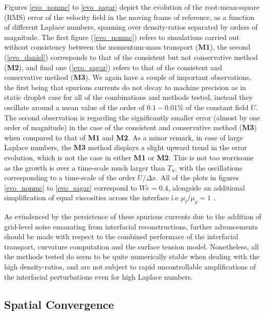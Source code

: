 Figures \ref{evo_nonmc} to \ref{evo_sagar} depict the evolution of the root-mean-square (RMS) error of the velocity field in the moving frame of reference, as a function of different Laplace numbers, spanning over density-ratios separated by orders of magnitude. The first figure (\ref{evo_nonmc}) refers to simulations carried out without consistency between the momentum-mass transport (\textbf{M1}), the second (\ref{evo_daniel}) corresponds to that of the consistent but not conservative method (\textbf{M2}), and final one (\ref{evo_sagar}) refers to that of the consistent and conservative method (\textbf{M3}). We again have a couple of important observations, the first being that spurious currents do not decay to machine precision as in static droplet case for all of the combinations and methods tested, instead they oscillate around a mean value of the order of $0.1-0.01 \% $ of the constant field $U$. The second observation is regarding the significantly smaller error (almost by one order of magnitude) in the case of the consistent and conservative method (\textbf{M3}) when compared to that of \textbf{M1} and \textbf{M2}. As a minor remark, in case of large Laplace numbers, the \textbf{M3} method displays a slight upward trend in the error evolution, which is not the case in either \textbf{M1} or \textbf{M2}. This is not too worrisome as the growth is over a time-scale much larger than $T_u$, with the oscillations corresponding to a time-scale of the order $U/\Delta x$. All of the plots in figures \ref{evo_nonmc} to \ref{evo_sagar} correspond to $We = 0.4$, alongside an additional simplification of equal viscosities across the interface i.e $\mu_l/\mu_g = 1$ .

As evindenced by the persistence of these spurious currents due to the addition of grid-level noise emanating from interfacial reconstructions, further advancements should be made with respect to the combined performace of the interfacial transport, curvature computation and the surface tension model. Nonetheless, all the methods tested do seem to be quite numerically stable when dealing with the high density-ratios, and are not subject to rapid uncontrollable amplifications of the interfacial perturbations even for high Laplace numbers.

\subsection*{Spatial Convergence}

